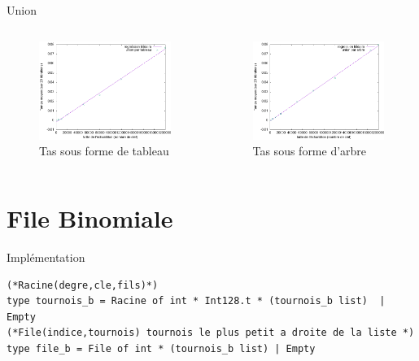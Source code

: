\documentclass[11pt]{beamer}
\begin{document}
\begin{frame}{Union}

\begin{columns}[t]
  \begin{column}{5cm}
  
\begin{figure}[hbtp]
\centering
\includegraphics[width=5cm]{../Images/svg courbes pour rapport/cplxt_union_tab_regression.png}
\caption{Tas sous forme de tableau}
\label{fig1}
\end{figure}


  \end{column}
  
  \begin{column}{5cm}
  
\begin{figure}[hbtp]
\centering
\includegraphics[width=5cm]{../Images/svg courbes pour rapport/cplxt_union_arbre_regression.png}
\caption{Tas sous forme d'arbre}
\label{fig2}
\end{figure}
  
  
  \end{column}
 \end{columns}  



\end{frame}

\section{File Binomiale}

\begin{frame}[fragile]{Implémentation}

\bigskip \begin{lstlisting}
(*Racine(degre,cle,fils)*)
type tournois_b = Racine of int * Int128.t * (tournois_b list)  | Empty 
(*File(indice,tournois) tournois le plus petit a droite de la liste *) 
type file_b = File of int * (tournois_b list) | Empty 
\end{lstlisting} \bigskip

\end{frame}
\end{document}
